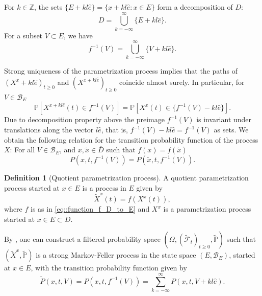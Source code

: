 \documentclass[11pt]{article}
\numberwithin{equation}{section}
\theoremstyle{definition}
\newtheorem{definition}[theorem]{Definition}
\begin{document}
For $k\in\mathbb{Z}$, the sets $\{E + kl\hat{e}\} = \{x+kl\hat{e}: x\in E\}$ form a decomposition of $D$:
\[
    D = \bigcup\limits_{k=-\infty}^{\infty}\{E + kl\hat{e}\}.
\]
For a subset $V\subset E$, we have
\[
    f^{-1}(V) = \bigcup\limits_{k=-\infty}^{\infty}\{V + kl\hat{e}\}.
\]

Strong uniqueness of the parametrization process implies that the paths of $(X^{x}+kl\hat{e})_{t\ge 0}$ and $(X^{x+kl\hat{e}})_{t\ge 0}$ coincide almost surely. In particular, for $V\in \mathcal{B}_{E}$
\[
    \mathbb{P}\left[X^{x+kl\hat{e}}(t)\in f^{-1}(V)\right] 
    =\mathbb{P}\left[X^{x}(t)\in \{f^{-1}(V)-kl\hat{e}\}\right].
\]
Due to decomposition property above the preimage $f^{-1}(V)$ is invariant under translations along the vector $l\hat{e}$, that is, $f^{-1}(V)-kl\hat{e} = f^{-1}(V)$ as sets. We obtain the following relation for the transition probability function of the process $X$: For all $V\in \mathcal{B}_{E}$, and $x,\tilde x\in \overline D$ such that $f(x) = f(\tilde x)$
\begin{equation}\label{eq::transition_function_Dynkin}
P(x,t,f^{-1}(V)) 
    = P(\tilde x,t,f^{-1}(V)).    
\end{equation}
\begin{definition}[Quotient parametrization process] A quotient parametrization process started at $x\in E$ is a process in $E$ given by 
\[
    \tilde{X}^{x}(t) = f(X^{x}(t)),
\]    
where $f$ is as in \eqref{eq::function_f_D_to_E} and $X^{x}$ is a parametrization process started at $x\in E\subset D$.
\end{definition}

By \cite[Theorem 10.13]{dynkin1965markovI}, one can construct a filtered probability space $(\Omega, (\tilde{\mathcal{F}}_{t})_{t\ge 0}, \tilde{\mathbb{P}})$ such that $(\tilde{X}^{x},\tilde{\mathbb{P}})$ is a strong Markov-Feller process in the state space $(E, \mathcal{B}_{E})$, started at $x\in E$, with the transition probability function given by 
\[
    \tilde P(x, t, V) = P(x,t,f^{-1}(V)) = \sum\limits_{k=-\infty}^{\infty} P(x,t,V + kl\hat{e}).
\]
\end{document}

